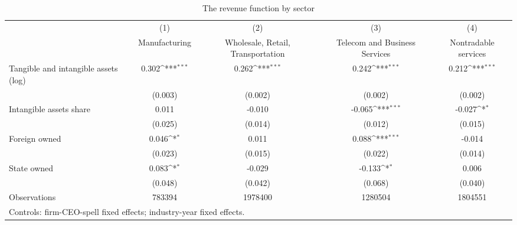 \begin{table}[htbp]\centering
\def\sym#1{\ifmmode^{#1}\else\(^{#1}\)\fi}
\caption{The revenue function by sector}
\begin{tabular}{l*{4}{c}}
\hline\hline
                    &\multicolumn{1}{c}{(1)}&\multicolumn{1}{c}{(2)}&\multicolumn{1}{c}{(3)}&\multicolumn{1}{c}{(4)}\\
                    &\multicolumn{1}{c}{Manufacturing}&\multicolumn{1}{c}{Wholesale, Retail, Transportation}&\multicolumn{1}{c}{Telecom and Business Services}&\multicolumn{1}{c}{Nontradable services}\\
\hline
Tangible and intangible assets (log)&       0.302\sym{***}&       0.262\sym{***}&       0.242\sym{***}&       0.212\sym{***}\\
                    &     (0.003)         &     (0.002)         &     (0.002)         &     (0.002)         \\
[1em]
Intangible assets share&       0.011         &      -0.010         &      -0.065\sym{***}&      -0.027\sym{*}  \\
                    &     (0.025)         &     (0.014)         &     (0.012)         &     (0.015)         \\
[1em]
Foreign owned       &       0.046\sym{*}  &       0.011         &       0.088\sym{***}&      -0.014         \\
                    &     (0.023)         &     (0.015)         &     (0.022)         &     (0.014)         \\
[1em]
State owned         &       0.083\sym{*}  &      -0.029         &      -0.133\sym{*}  &       0.006         \\
                    &     (0.048)         &     (0.042)         &     (0.068)         &     (0.040)         \\
\hline
Observations        &      783394         &     1978400         &     1280504         &     1804551         \\
\hline\hline
\multicolumn{5}{l}{\footnotesize Controls: firm-CEO-spell fixed effects; industry-year fixed effects.}\\
\end{tabular}
\end{table}
